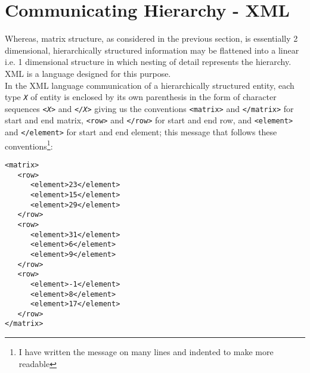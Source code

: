
 

\section{Communicating Hierarchy - XML}

\noindent Whereas, matrix structure, as considered in the previous section, is essentially 2 dimensional, hierarchically structured information may be flattened into a linear i.e. 1 dimensional structure 
in which nesting of detail represents the hierarchy. XML is a language designed for this purpose.\\

\noindent In the XML language communication of a hierarchically structured entity, each type \texttt{\textit{X}} of entity is enclosed by its own parenthesis in the form
of character sequences  \verb|<|\texttt{\textit{X}}\verb|>| and \verb|<|\texttt{\textit{/X}}\verb|>|  giving us the conventions \verb|<matrix>| and \verb|</matrix>| for start and end matrix, \verb|<row>| and \verb|</row>| for start and end row, and \verb|<element>| and \verb|</element>| for start and end element; this message that follows these conventions\footnote{I have written the message on many lines and indented to make more readable}:  \\
\begin{verbatim}
<matrix>
   <row>
      <element>23</element>
      <element>15</element>
      <element>29</element>
   </row>
   <row>
      <element>31</element>
      <element>6</element> 
      <element>9</element>
   </row>
   <row>
      <element>-1</element>
      <element>8</element>
      <element>17</element>
   </row>
</matrix>
\end{verbatim}

